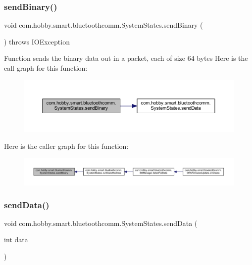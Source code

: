 \subsubsection{\texorpdfstring{send\+Binary()}{sendBinary()}}
{\footnotesize\ttfamily void com.\+hobby.\+smart.\+bluetoothcomm.\+System\+States.\+send\+Binary (\begin{DoxyParamCaption}{ }\end{DoxyParamCaption}) throws I\+O\+Exception}

Function sends the binary data out in a packet, each of size 64 bytes Here is the call graph for this function\+:\nopagebreak
\begin{figure}[H]
\begin{center}
\leavevmode
\includegraphics[width=350pt]{classcom_1_1hobby_1_1smart_1_1bluetoothcomm_1_1_system_states_aa47a31862e84238f71df30cfe26a6d80_cgraph}
\end{center}
\end{figure}
Here is the caller graph for this function\+:\nopagebreak
\begin{figure}[H]
\begin{center}
\leavevmode
\includegraphics[width=350pt]{classcom_1_1hobby_1_1smart_1_1bluetoothcomm_1_1_system_states_aa47a31862e84238f71df30cfe26a6d80_icgraph}
\end{center}
\end{figure}
\mbox{\label{classcom_1_1hobby_1_1smart_1_1bluetoothcomm_1_1_system_states_a2fb76b16d2f0857f8951c93d38c8e9b8}} 
\subsubsection{\texorpdfstring{send\+Data()}{sendData()}}
{\footnotesize\ttfamily void com.\+hobby.\+smart.\+bluetoothcomm.\+System\+States.\+send\+Data (\begin{DoxyParamCaption}\item[{int}]{data }\end{DoxyParamCaption})}

